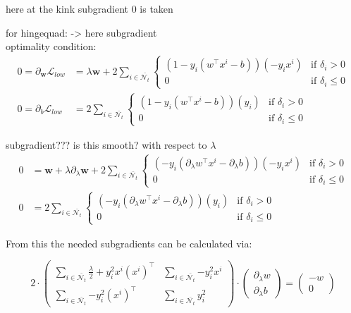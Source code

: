 	here at the kink subgradient 0 is taken

for hingequad: -> here subgradient \\
optimality condition:
\begin{align}
	0 = \partial_{\bm{w}}\mathcal{L}_{low} &= \lambda \bm{w}+2\sum_{i \in \bar{\mathcal{N}_t}}{\left\{\begin{array}{cl} (1-y_i(w^{\top}x^i-b))(-y_ix^i) & \text{if } \delta_i >0 \\ 0 & \text{if } \delta_i \leq 0 \end{array} \right.} \\
	0 = \partial_b\mathcal{L}_{low} &= 2\sum_{i \in \bar{\mathcal{N}_t}}{\left\{\begin{array}{cl} (1-y_i(w^{\top}x^i-b))(y_i) & \text{if } \delta_i >0 \\ 0 & \text{if } \delta_i \leq 0 \end{array} \right.}
	\end{align}
	
subgradient??? is this smooth? with respect to \(\lambda\)
\begin{align}
	0 &= \bm{w}+\lambda\partial_{\lambda}\bm{w}+2\sum_{i \in \bar{\mathcal{N}_t}}{\left\{\begin{array}{cl} (-y_i(\partial_{\lambda}w^{\top}x^i-\partial_{\lambda}b))(-y_ix^i) & \text{if } \delta_i >0 \\ 0 & \text{if } \delta_i \leq 0 \end{array} \right.} \\
	0 &= 2\sum_{i \in \bar{\mathcal{N}_t}}{\left\{\begin{array}{cl} (-y_i(\partial_{\lambda}w^{\top}x^i-\partial_{\lambda}b))(y_i) & \text{if } \delta_i >0 \\ 0 & \text{if } \delta_i \leq 0 \end{array} \right.}
\end{align}

From this the needed subgradients can be calculated via:

\begin{equation}
	2\cdot\begin{pmatrix} \sum_{i \in \bar{\mathcal{N}_t}}\frac{\lambda}{2}+{y_i^2x^i(x^i)^{\top}} & \sum_{i \in \bar{\mathcal{N}_t}}	{-y_i^2x^i} \\ \sum_{i \in \bar{\mathcal{N}_t}}{-y_i^2(x^i)^{\top}} & \sum_{i \in \bar{\mathcal{N}_t}}{y_i^2}\end{pmatrix}
	\cdot \begin{pmatrix} \partial_{\lambda}w \\ \partial_{\lambda}b\end{pmatrix}
	= \begin{pmatrix}-w \\ 0\end{pmatrix}
\label{subgr_wb}
\end{equation}

